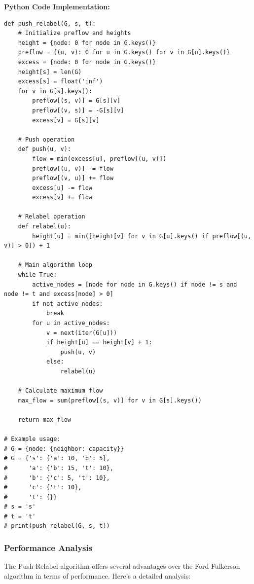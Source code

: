 \documentclass[12pt]{book} %
\begin{document}
\FloatBarrier
\textbf{Python Code Implementation:}
\FloatBarrier
\begin{lstlisting}
def push_relabel(G, s, t):
    # Initialize preflow and heights
    height = {node: 0 for node in G.keys()}
    preflow = {(u, v): 0 for u in G.keys() for v in G[u].keys()}
    excess = {node: 0 for node in G.keys()}
    height[s] = len(G)
    excess[s] = float('inf')
    for v in G[s].keys():
        preflow[(s, v)] = G[s][v]
        preflow[(v, s)] = -G[s][v]
        excess[v] = G[s][v]
    
    # Push operation
    def push(u, v):
        flow = min(excess[u], preflow[(u, v)])
        preflow[(u, v)] -= flow
        preflow[(v, u)] += flow
        excess[u] -= flow
        excess[v] += flow
    
    # Relabel operation
    def relabel(u):
        height[u] = min([height[v] for v in G[u].keys() if preflow[(u, v)] > 0]) + 1
    
    # Main algorithm loop
    while True:
        active_nodes = [node for node in G.keys() if node != s and node != t and excess[node] > 0]
        if not active_nodes:
            break
        for u in active_nodes:
            v = next(iter(G[u]))
            if height[u] == height[v] + 1:
                push(u, v)
            else:
                relabel(u)
    
    # Calculate maximum flow
    max_flow = sum(preflow[(s, v)] for v in G[s].keys())
    
    return max_flow

# Example usage:
# G = {node: {neighbor: capacity}}
# G = {'s': {'a': 10, 'b': 5},
#      'a': {'b': 15, 't': 10},
#      'b': {'c': 5, 't': 10},
#      'c': {'t': 10},
#      't': {}}
# s = 's'
# t = 't'
# print(push_relabel(G, s, t))
\end{lstlisting}

\subsubsection{Performance Analysis}

The Push-Relabel algorithm offers several advantages over the Ford-Fulkerson algorithm in terms of performance. Here's a detailed analysis:
\end{document}
